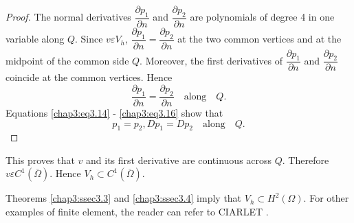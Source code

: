 \begin{proof}
The normal derivatives $\dfrac{\partial p_1}{\partial n}$ and
$\dfrac{\partial p_2}{\partial n}$ are polynomials of degree 4 in one
variable along $Q$. Since $v\varepsilon V_h$, $\dfrac{\partial p_1}
{\partial n}=\dfrac{\partial p_2}{\partial n}$ at the two common
vertices and at the midpoint of the common side $Q$. Moreover, the
first derivatives of $\dfrac{\partial p_1}{\partial n}$ and
$\dfrac{\partial p_2}{\partial n}$ coincide at the common
vertices. Hence 
\begin{equation}\label{chap3:eq3.16}
\frac{\partial p_1}{\partial n}=\frac{\partial p_2}{\partial n}
\quad\text{along}\quad Q.
\end{equation}
Equations \eqref{chap3:eq3.14} - \eqref{chap3:eq3.16} show that 
$$
p_1=p_2, Dp_1=Dp_2\quad\text{along}\quad Q.
$$
\end{proof}

This proves that $v$ and its first derivative are continuous across
$Q$. Therefore $v\varepsilon C^1(\overline{\Omega})$. Hence
$V_h\subset C^1(\overline{\Omega})$.

Theorems \ref{chap3:ssec3.3} and \ref{chap3:ssec3.4} imply that
$V_h\subset H^2(\Omega)$. For other examples of finite element, the
reader can refer to CIARLET \cite{key9}.

 
